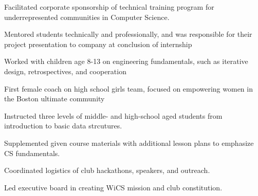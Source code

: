 \documentclass[]{csaund_resume-openfont}
\begin{document}
\begin{tightemize}
\item Facilitated corporate sponsorship of technical training program for underrepresented communities in Computer Science.
\item Mentored students technically and professionally, and was responsible for their project presentation to company at conclusion of internship
\end{tightemize}
\sectionsep

\begin{tightemize}
\item Worked with children age 8-13 on engineering fundamentals, such as iterative design, retrospectives, and cooperation
\end{tightemize}
\sectionsep

\begin{tightemize}
\item First female coach on high school girls team, focused on empowering women in the Boston ultimate community
\end{tightemize}
\sectionsep

\begin{tightemize}
\item Instructed three levels of middle- and high-school aged students from introduction to basic data strcutures. 
\item Supplemented given course materials with additional lesson plans to emphasize CS fundamentals.
\end{tightemize}
\sectionsep

\begin{tightemize}
\item Coordinated logistics of club hackathons, speakers, and outreach.
\item Led executive board in creating WiCS mission and club constitution.
\end{tightemize}
\sectionsep
\end{document}
